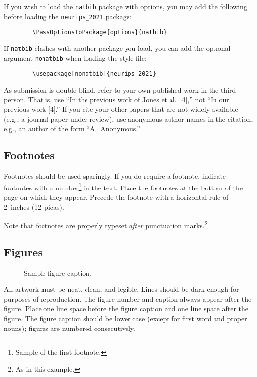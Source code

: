 \documentclass{article}
\begin{document}
	If you wish to load the \verb+natbib+ package with options, you may add the
	following before loading the \verb+neurips_2021+ package:
	\begin{verbatim}
		\PassOptionsToPackage{options}{natbib}
	\end{verbatim}
	
	If \verb+natbib+ clashes with another package you load, you can add the optional
	argument \verb+nonatbib+ when loading the style file:
	\begin{verbatim}
		\usepackage[nonatbib]{neurips_2021}
	\end{verbatim}
	
	As submission is double blind, refer to your own published work in the third
	person. That is, use ``In the previous work of Jones et al.\ [4],'' not ``In our
	previous work [4].'' If you cite your other papers that are not widely available
	(e.g., a journal paper under review), use anonymous author names in the
	citation, e.g., an author of the form ``A.\ Anonymous.''
	
	\subsection{Footnotes}
	
	Footnotes should be used sparingly.  If you do require a footnote, indicate
	footnotes with a number\footnote{Sample of the first footnote.} in the
	text. Place the footnotes at the bottom of the page on which they appear.
	Precede the footnote with a horizontal rule of 2~inches (12~picas).
	
	Note that footnotes are properly typeset \emph{after} punctuation
	marks.\footnote{As in this example.}
	
	\subsection{Figures}
	
	\begin{figure}
		\centering
		\fbox{\rule[-.5cm]{0cm}{4cm} \rule[-.5cm]{4cm}{0cm}}
		\caption{Sample figure caption.}
	\end{figure}
	
	All artwork must be neat, clean, and legible. Lines should be dark enough for
	purposes of reproduction. The figure number and caption always appear after the
	figure. Place one line space before the figure caption and one line space after
	the figure. The figure caption should be lower case (except for first word and
	proper nouns); figures are numbered consecutively.
	
\end{document}
